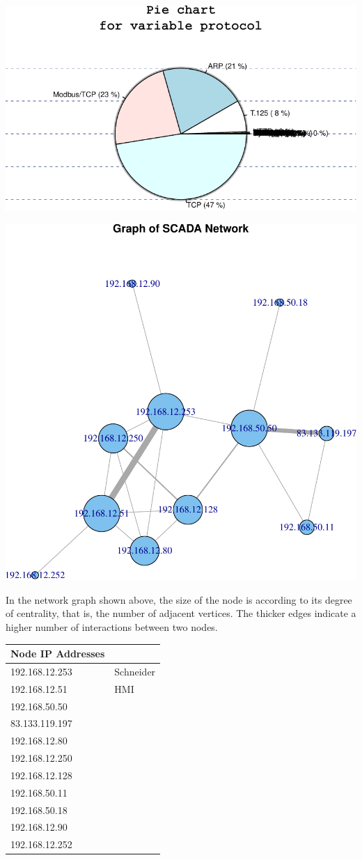 \documentclass[]{article}
\begin{document}
\begin{center}\includegraphics{edaReport_files/figure-latex/unnamed-chunk-4-1} \end{center}

\includegraphics{edaReport_files/figure-latex/unnamed-chunk-5-1.pdf}

In the network graph shown above, the size of the node is according to
its degree of centrality, that is, the number of adjacent vertices. The
thicker edges indicate a higher number of interactions between two
nodes.

\begin{longtable}[c]{@{}ll@{}}
\toprule
Node IP Addresses &\tabularnewline
\midrule
\endhead
192.168.12.253 & Schneider\tabularnewline
192.168.12.51 & HMI\tabularnewline
192.168.50.50 &\tabularnewline
83.133.119.197 &\tabularnewline
192.168.12.80 &\tabularnewline
192.168.12.250 &\tabularnewline
192.168.12.128 &\tabularnewline
192.168.50.11 &\tabularnewline
192.168.50.18 &\tabularnewline
192.168.12.90 &\tabularnewline
192.168.12.252 &\tabularnewline
\bottomrule
\end{longtable}
\end{document}
